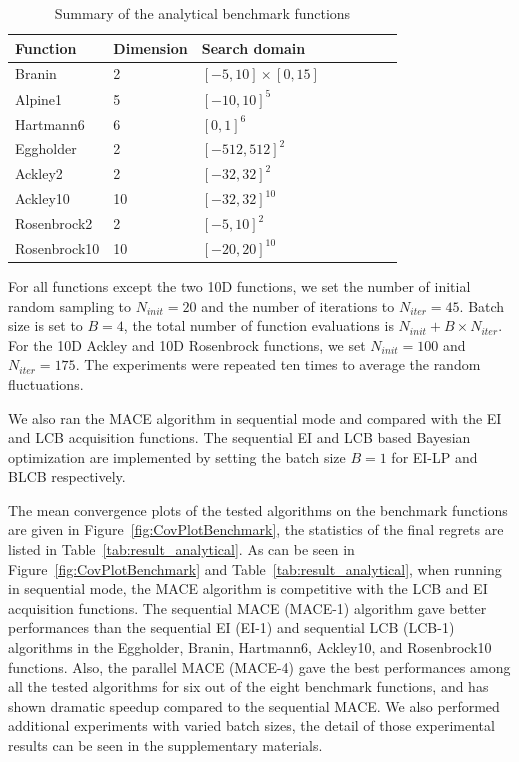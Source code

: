 \begin{table}[!htb]
    \centering
    \caption{Summary of the analytical benchmark functions}
    \label{tab:summaryanalygical}
    \begin{tabular}{llllllll}
        \toprule
         Function           & Dimension        & Search domain             \\ \midrule
         Branin             & 2                & $[-5,  10]\times[0, 15]$  \\
         Alpine1            & 5                & $[-10, 10]^5$             \\
         Hartmann6          & 6                & $[0,   1]^6$              \\
         Eggholder          & 2                & $[-512, 512]^2$           \\
         Ackley2            & 2                & $[-32, 32]^2$             \\
         Ackley10           & 10               & $[-32, 32]^{10}$          \\
         Rosenbrock2        & 2                & $[-5,  10]^2$             \\
         Rosenbrock10       & 10               & $[-20, 20]^{10}$          \\
        \bottomrule
    \end{tabular}
\end{table}


For all functions except the two 10D functions, we set the number of initial
random sampling to $N_{init} = 20$ and the number of iterations to $N_{iter} =
45$. Batch size is set to $B = 4$, the total number of function evaluations is
$N_{init} + B \times N_{iter}$. For the 10D Ackley and 10D Rosenbrock functions, we set
$N_{init} = 100$ and $N_{iter} = 175$. The experiments were repeated ten
times to average the random fluctuations.

We also ran the MACE algorithm in sequential mode and compared with the EI and LCB
acquisition functions. The sequential EI and LCB based Bayesian optimization
are implemented by setting the batch size $B = 1$ for EI-LP and BLCB
respectively.


The mean convergence plots of the tested algorithms on the benchmark functions
are given in Figure~\ref{fig:CovPlotBenchmark}, the statistics of the final
regrets are listed in Table~\ref{tab:result_analytical}. As can be seen in
Figure~\ref{fig:CovPlotBenchmark} and Table~\ref{tab:result_analytical}, when
running in sequential mode, the MACE algorithm is competitive with the LCB and
EI acquisition functions. The sequential MACE (MACE-1) algorithm gave better
performances than the sequential EI (EI-1) and sequential LCB (LCB-1)
algorithms in the Eggholder, Branin, Hartmann6, Ackley10, and Rosenbrock10
functions. Also, the parallel MACE (MACE-4) gave the best performances among
all the tested algorithms for six out of the eight benchmark functions, and has
shown dramatic speedup compared to the sequential MACE. We also performed
additional experiments with varied batch sizes, the detail of those
experimental results can be seen in the supplementary materials.

